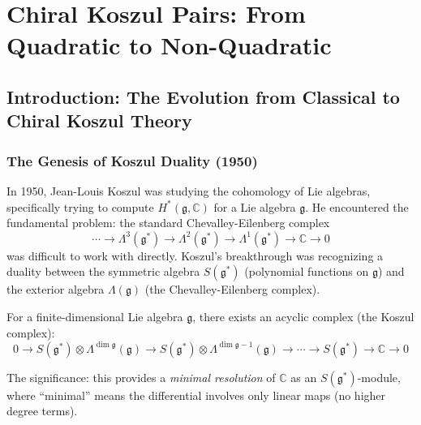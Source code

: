 
\chapter{Chiral Koszul Pairs: From Quadratic to Non-Quadratic}
\label{ch:chiral-koszul-duality}


\section{Introduction: The Evolution from Classical to Chiral Koszul Theory}

\subsection{The Genesis of Koszul Duality (1950)}

In 1950, Jean-Louis Koszul was studying the cohomology of Lie algebras, specifically trying to compute $H^*(\mathfrak{g}, \mathbb{C})$ for a Lie algebra $\mathfrak{g}$. He encountered the fundamental problem: the standard Chevalley-Eilenberg complex
\[
\cdots \to \Lambda^3(\mathfrak{g}^*) \to \Lambda^2(\mathfrak{g}^*) \to \Lambda^1(\mathfrak{g}^*) \to \mathbb{C} \to 0
\]
was difficult to work with directly. Koszul's breakthrough was recognizing a duality between the symmetric algebra $S(\mathfrak{g}^*)$ (polynomial functions on $\mathfrak{g}$) and the exterior algebra $\Lambda(\mathfrak{g})$ (the Chevalley-Eilenberg complex).

\begin{theorem}[Koszul 1950]
For a finite-dimensional Lie algebra $\mathfrak{g}$, there exists an acyclic complex (the Koszul complex):
\[
0 \to S(\mathfrak{g}^*) \otimes \Lambda^{\dim \mathfrak{g}}(\mathfrak{g}) \to S(\mathfrak{g}^*) \otimes \Lambda^{\dim \mathfrak{g}-1}(\mathfrak{g}) \to \cdots \to S(\mathfrak{g}^*) \to \mathbb{C} \to 0
\]
\end{theorem}

The significance: this provides a \emph{minimal resolution} of $\mathbb{C}$ as an $S(\mathfrak{g}^*)$-module, where ``minimal'' means the differential involves only linear maps (no higher degree terms).

